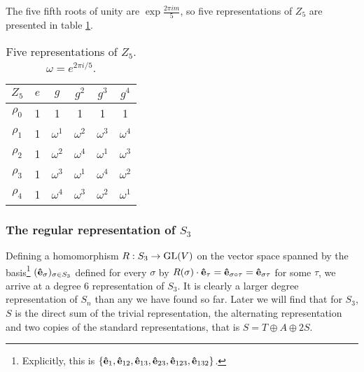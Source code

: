 		\begin{example}
			The five fifth roots of unity are $\exp{\frac{2\pi im}{5}}$, so five representations of $Z_5$ are presented in table \ref{table:Z5}.
			
			\begin{table}[hbt!]
				\centering
				\caption{Five representations of $Z_5$. $\omega = e^{2 \pi i/5}$.}
				\begin{tabular}{c | c c c c c}
					\label{table:Z5}
					$Z_5$ & $e$ & $g$        & $g^2$      & $g^3$      & $g^4$      \\ \hline
					$\rho_0$            & 1   & 1          & 1          & 1          & 1          \\
					$\rho_1$            & 1   & $\omega^1$ & $\omega^2$ & $\omega^3$ & $\omega^4$ \\
					$\rho_2$            & 1   & $\omega^2$ & $\omega^4$ & $\omega^1$ & $\omega^3$ \\
					$\rho_3$            & 1   & $\omega^3$ & $\omega^1$ & $\omega^4$ & $\omega^2$ \\
					$\rho_4$            & 1   & $\omega^4$ & $\omega^3$ & $\omega^2$ & $\omega^1$
				\end{tabular}
			\end{table}
		\end{example}
		
	\subsubsection{The regular representation of $S_3$}
	
		Defining a homomorphism $R: S_3 \rightarrow \text{GL}(V)$ on the vector space spanned by the basis\footnote{Explicitly, this is $\left\lbrace \mathbf{\hat{e}}_1, \mathbf{\hat{e}}_{12}, \mathbf{\hat{e}}_{13}, \mathbf{\hat{e}}_{23}, \mathbf{\hat{e}}_{123}, \mathbf{\hat{e}}_{132} \right\rbrace$.} $(\mathbf{\hat{e}}_{\sigma})_{\sigma \in S_3}$ defined for every $\sigma$ by $R(\sigma) \cdot \mathbf{\hat{e}}_\tau = \mathbf{\hat{e}}_{\sigma \circ \tau} = \mathbf{\hat{e}}_{\sigma\tau}$ for some $\tau$, we arrive at a degree 6 representation of $S_3$. It is clearly a larger degree representation of $S_n$ than any we have found so far. Later we will find that for $S_3$, $S$ is the direct sum of the trivial representation, the alternating representation and two copies of the standard representations, that is $S = T \oplus A \oplus 2S$.

		
			
			